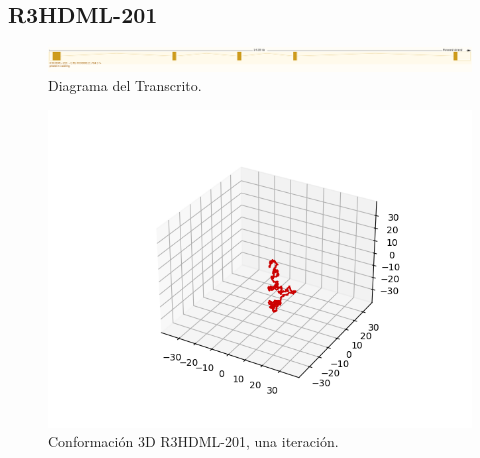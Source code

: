 \documentclass[a4paper,11pt,titlepage]{article}
\theoremstyle{definition}
\begin{document}
\newpage
\subsection*{R3HDML-201}\label{subsec:gene5}

\begin{figure}[H]
    \centering
    \includegraphics[width=\textwidth]{images/R3HDML-201.png}
    \caption{Diagrama del Transcrito.}
    \label{fig:R3HDML-201-diag}
\end{figure}

\begin{figure}[H]
    \centering
    \begin{minipage}[c]{0.45\textwidth}
        \centering
        \includegraphics[width=\textwidth]{images/R3HDML-201-db_one.png}
        \caption{Conformación 3D R3HDML-201, una iteración.}
        \label{fig:R3HDML-201-one}
    \end{minipage}
    \hfill
    \begin{minipage}[c]{0.45\textwidth}
        \centering

\end{minipage}
\end{figure}
\end{document}
